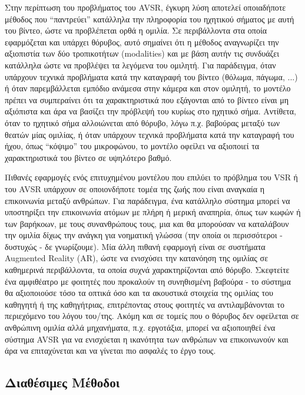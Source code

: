Στην περίπτωση του προβλήματος του AVSR, έγκυρη λύση αποτελεί οποιαδήποτε μέθοδος που ``παντρεύει'' κατάλληλα την πληροφορία του ηχητικού σήματος με αυτή του βίντεο, ώστε να προβλέπεται ορθά η ομιλία. Σε περιβάλλοντα στα οποία εφαρμόζεται και υπάρχει θόρυβος, αυτό σημαίνει ότι η μέθοδος αναγνωρίζει την αξιοπιστία των δύο τροπικοτήτων (modalities) και με βάση αυτήν τις συνδυάζει κατάλληλα ώστε να προβλέψει τα λεγόμενα του ομιλητή. Για παράδειγμα, όταν υπάρχουν τεχνικά προβλήματα κατά την καταγραφή του βίντεο (θόλωμα, πάγωμα, ...) ή όταν παρεμβάλλεται εμπόδιο ανάμεσα στην κάμερα και στον ομιλητή, το μοντέλο πρέπει να συμπεραίνει ότι τα χαρακτηριστικά που εξάγονται από το βίντεο είναι μη αξιόπιστα και άρα να βασίζει την πρόβλεψή του κυρίως στο ηχητικό σήμα. Αντίθετα, όταν το ηχητικό σήμα αλλοιώνεται από θόρυβο, λόγω π.χ. βαβούρας μεταξύ των θεατών μίας ομιλίας, ή όταν υπάρχουν τεχνικά προβλήματα κατά την καταγραφή του ήχου, όπως ``κόψιμο'' του μικροφώνου, το μοντέλο οφείλει να αξιοποιεί τα χαρακτηριστικά του βίντεο σε υψηλότερο βαθμό.

Πιθανές εφαρμογές ενός επιτυχημένου μοντέλου που επιλύει το πρόβλημα του VSR ή του AVSR υπάρχουν σε οποιονδήποτε τομέα της ζωής που είναι αναγκαία η επικοινωνία μεταξύ ανθρώπων. Για παράδειγμα, ένα κατάλληλο σύστημα μπορεί να υποστηρίξει την επικοινωνία ατόμων με πλήρη ή μερική αναπηρία, όπως των κωφών ή των βαρήκοων, με τους συνανθρώπους τους, μια και θα μπορούσαν να καταλάβουν την ομιλία δίχως την ανάγκη για νοηματική γλώσσα (την οποία οι περισσότεροι - δυστυχώς - δε γνωρίζουμε). Μία άλλη πιθανή εφαρμογή είναι σε συστήματα Augmented Reality (AR), ώστε να ενισχύσει την κατανόηση της ομιλίας σε καθημερινά περιβάλλοντα, τα οποία συχνά χαρακτηρίζονται από θόρυβο. Σκεφτείτε ένα αμφιθέατρο με φοιτητές που προκαλούν τη συνηθισμένη βαβούρα - το σύστημα θα αξιοποιούσε τόσο τα οπτικά όσο και τα ακουστικά στοιχεία της ομιλίας του καθηγητή ή της καθηγήτριας, επιτρέποντας στους φοιτητές να αντιλαμβάνονται το περιεχόμενο του λόγου του/της. Ακόμη και σε τομείς που ο θόρυβος δεν οφείλεται σε ανθρώπινη ομιλία αλλά μηχανήματα, π.χ. εργοτάξια, μπορεί να αξιοποιηθεί ένα σύστημα AVSR για να ενισχύεται η ικανότητα των ανθρώπων να επικοινωνούν και άρα να επιταχύνεται και να γίνεται πιο ασφαλές το έργο τους.

\subsection{Διαθέσιμες Μέθοδοι}

